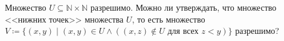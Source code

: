 Множество $U \subseteq \mathbb{N} \times \mathbb{N}$ разрешимо. Можно ли утверждать, что множество
<<нижних точек>> множества $U$, то есть множество
$V \coloneqq \{ (x, y) \mid (x, y) \in U \land ((x, z) \notin U \text{ для всех } z < y )\}$ разрешимо?
